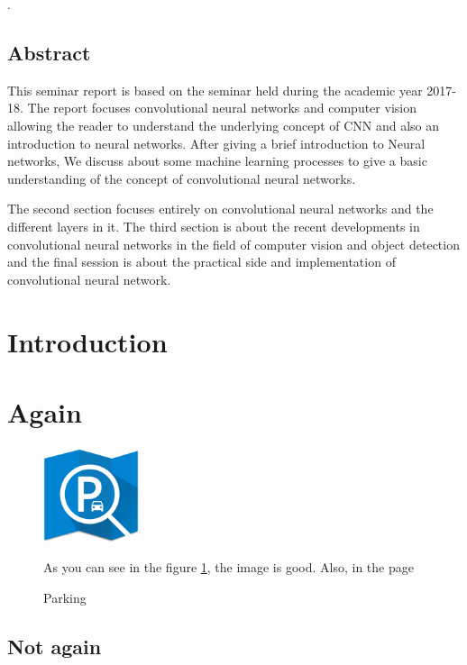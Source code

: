 \documentclass[12pt]{article}
\begin{document}
\newpage
.
\vspace{50mm}
\begin{center}
\section*{\fontsize{16}{18}\selectfont Abstract}
\end{center}
\par This seminar report is based on the seminar held during the academic year 2017-18. The report focuses convolutional neural networks and computer vision allowing the reader to understand the underlying concept of CNN and also an introduction to neural networks. After giving a brief introduction to Neural networks, We discuss about some machine learning processes to give a basic understanding of the concept of convolutional neural networks. 
\vspace{5mm}
\par The second section focuses entirely on convolutional neural networks and the different layers in it. The third section is about the recent developments in convolutional neural networks in the field of computer vision and object detection and the final session is about the practical side and implementation of convolutional neural network.

\newpage
{}
\tableofcontents
\newpage
{}

\listoffigures
\newpage


\vspace{25mm}
\section{\fontsize{14}{14}\selectfont Introduction}
 
\section{\fontsize{14}{14}\selectfont Again}
\begin{figure}[h]
    \centering
    \includegraphics[width=0.25\textwidth]{a.png}
    \caption{Parking}
    \label{fig:mesh1}
    As you can see in the figure \ref{fig:mesh1}, the image is good. Also, in the page \pageref{fig:mesh1} 
\end{figure}
\Blindtext
\subsection{ Not again}
\Blindtext
\end{document}
